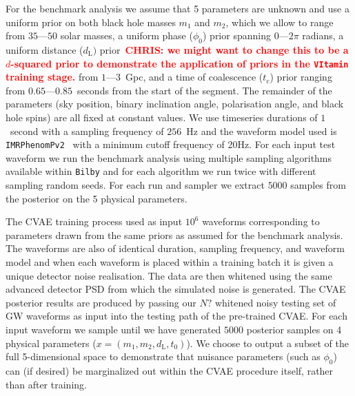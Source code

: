 \documentclass[%
showpacs,
 amsmath,amssymb,
 aps,
 twocolumn,
 prl,
 reprint,
floatfix,
]{revtex4-1}
\newcommand{\chris}[1]{\textbf{\textcolor{red}{CHRIS: #1}}}
\begin{document}
%
%
For the benchmark analysis we assume that 5 parameters are unknown and use a
uniform prior on both black hole masses $m_1$ and $m_2$, which we allow to
range from $35$---$50$ solar masses, a uniform phase ($\phi_0$) prior spanning
$0$---$2\pi$ radians, a uniform distance ($d_{\text{L}})$ prior~\chris{we might
want to change this to be a $d$-squared prior to demonstrate the application of
priors in the \texttt{VItamin} training stage.} from $1$---$3$~Gpc, and a time of
coalescence ($t_{\text{c}}$) prior ranging from
$0.65$---$0.85$~seconds from the
start of the segment. The remainder of the parameters (sky position, binary
inclination angle, polarisation angle, and black hole spins) are all fixed at
constant values. We use timeseries durations of $1$~second with a sampling
frequency of $256$~Hz and the waveform model used is
\texttt{IMRPhenomPv2}~\cite{1809.10113} with a minimum cutoff frequency of
20Hz. For each input test waveform we run the benchmark analysis using multiple
sampling algorithms available within \texttt{Bilby} and for each algorithm we
run twice with different sampling random seeds. For each run and sampler we
extract $5000$ samples from the posterior on the 5 physical parameters.  

%
%
The \ac{CVAE} training process used as input $10^{6}$ waveforms corresponding
to parameters drawn from the same priors as assumed for the benchmark analysis.
The waveforms are also of identical duration, sampling frequency, and waveform
model and when each waveform is placed within a training batch it is given a
unique detector noise realisation. The data are then whitened using the same
advanced detector \ac{PSD} from which the simulated noise is generated. The
\ac{CVAE} posterior results are produced by passing our $N?$ whitened noisy
testing set of \ac{GW} waveforms as input into the testing path of the
pre-trained \ac{CVAE}. For each input waveform we sample until we have
generated $5000$ posterior samples on 4 physical parameters
($x=(m_1,m_2,d_{\text{L}},t_{0})$). We choose to output a subset of the full
5-dimensional space to demonstrate that nuisance parameters (such as $\phi_0$) 
can (if desired) be marginalized out within the \ac{CVAE} procedure
itself, rather than after training. 
\end{document}
